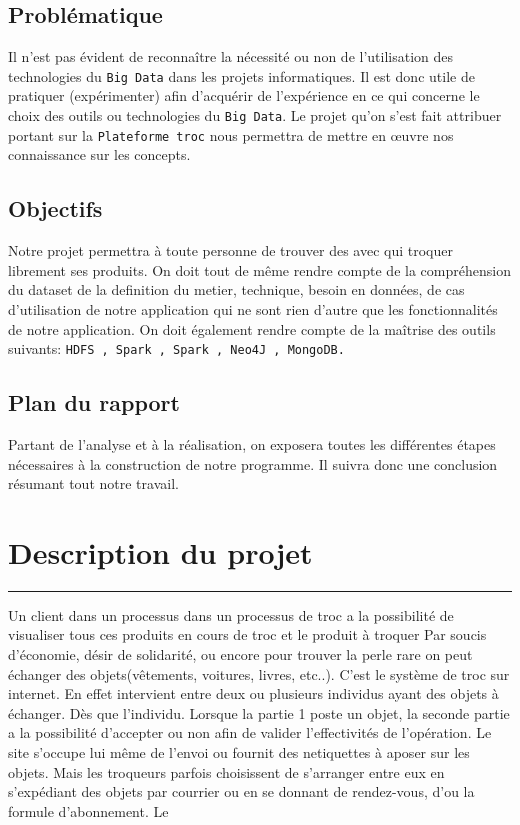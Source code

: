 \documentclass[12pt]{report}
\begin{document}
		\subsection{ \sc Problématique}
	Il n'est pas évident de reconnaître la nécessité ou non de l'utilisation des technologies du \texttt{Big Data} dans les projets informatiques. Il est donc utile de pratiquer (expérimenter) afin d'acquérir de l'expérience en ce qui concerne le choix des outils ou technologies du \texttt{Big Data}. Le projet qu'on s'est fait attribuer portant sur la \texttt{Plateforme troc} nous permettra de mettre en \oe uvre nos connaissance sur les concepts.
		\subsection{ \sc Objectifs}
		Notre projet permettra à toute personne de trouver des avec qui troquer librement ses produits. On doit tout de même rendre compte de la compréhension du dataset de la definition du metier, technique, besoin en données, de cas d'utilisation de notre application qui ne sont rien d'autre que les fonctionnalités de notre application. On doit également rendre compte de la maîtrise des outils suivants: \texttt{HDFS
			, Spark , Spark , Neo4J , MongoDB.} 
		
		\subsection{ \sc Plan du rapport}
		Partant de l'analyse et à la réalisation, on exposera toutes les différentes étapes nécessaires à la construction de notre programme. Il suivra donc une conclusion résumant tout notre travail.

	\newpage
	 \section{\sc Description du projet}
	 \rule{1 \textwidth}{0.5pt} \textbf{}
	 
	 \vspace{2em}
	 Un client dans un processus dans un processus de troc a la possibilité de visualiser tous ces produits en cours de troc et le produit à troquer
	 Par soucis d'économie, désir de solidarité, ou encore pour trouver la perle rare on peut échanger des objets(vêtements, voitures, livres, etc..). C'est le système de troc sur internet. En effet intervient entre deux ou plusieurs individus ayant des objets à échanger. Dès que l'individu. Lorsque la partie 1 poste un objet, la seconde partie a la possibilité d'accepter ou non afin de valider l'effectivités de l'opération. Le site s'occupe lui même de l'envoi ou fournit des netiquettes à aposer sur les objets. Mais les troqueurs parfois choisissent de s'arranger entre eux en s'expédiant des objets par courrier ou en se donnant de rendez-vous, d'ou la formule d'abonnement. Le 
	 
\end{document}
